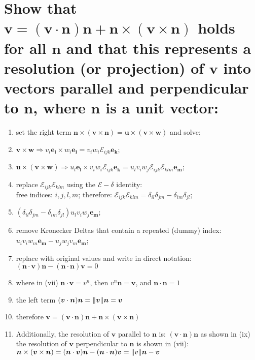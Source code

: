 \documentclass[10pt, letterpaper]{article}
\begin{document}
\section{Show that $\bm{v} = (\bm{v} \cdot \bm{n}) \bm{n} + \bm{n} \times (\bm{v} \times \bm{n})$ holds for all $\bm{n}$ and that 		this represents a resolution (or projection) of $\bm{v}$ into vectors parallel and perpendicular to $\bm{n}$, where
		 $\bm{n}$ is a unit vector:}
		 
	\begin{enumerate}[label = (\roman*)]
		\item set the right term  $\bm{n} \times (\bm{v} \times \bm{n}) = \bm{u} \times (\bm{v} \times \bm{w}) $ and solve;
		\item	$\bm{v} \times \bm{w} \Rightarrow v_i \bm{e_i} \times w_i \bm{e_i} = v_i w_i \mathcal{E}_{ijk} \bm{e_k} $;
		\item$ \bm{u} \times (\bm{v} \times \bm{w}) \Rightarrow u_l \bm{e_l} \times v_i w_i \mathcal{E}_{ijk} \bm{e_k}
			= u_l v_i w_j  \mathcal{E}_{ijk} \mathcal{E}_{klm} \bm{e_m} $;
		\item replace $\mathcal{E}_{ijk} \mathcal{E}_{klm} $ using the $\mathcal{E} - \delta$ identity:\\
			free indices: $\mathit{i, j, l, m}$; therefore:  $\mathcal{E}_{ijk} \mathcal{E}_{klm} = 
			\delta_{il} \delta_{jm} - \delta_{im} \delta_{jl}$;
		\item $(\delta_{il} \delta_{jm} - \delta_{im} \delta_{jl}) u_l v_i w_j \bm{e_m}$;
		\item remove Kronecker Deltas that contain a repeated (dummy) index:  $u_i v_i w_m \bm{e_m} - u_j w_j v_m 
			\bm{e_m}$;
		\item replace with original values and write in direct notation: $(\bm{n} \cdot \bm{v}) \bm{n} - 
			(\bm{n} \cdot \bm{n}) \bm{v} = 0$
		\item where in (vii) $\bm{n} \cdot \bm{v} = v^n$, then $v^n \bm{n} = \bm{v}$, and $\bm{n} \cdot \bm{n} = 1$
		\item the left term $(\bm{v} \cdot \bm{n}) \bm{n}= \Arrowvert \bm{v} \Arrowvert \bm{n} = \bm{v}$
		\item therefore $\bm{v} = (\bm{v} \cdot \bm{n}) \bm{n} + \bm{n} \times (\bm{v} \times \bm{n})$
		\item Additionally, the resolution of $\bm{v}$ parallel to $\bm{n}$ is: $(\bm{v} \cdot \bm{n}) \bm{n}$ as shown in (ix)\\
			the resolution of $\bm{v}$ perpendicular to $\bm{n}$ is shown in (vii): $\bm{n} \times (\bm{v} \times \bm{n})
			 =(\bm{n} \cdot \bm{v}) \bm{n} - 
			(\bm{n} \cdot \bm{n}) \bm{v} = \Arrowvert v \Arrowvert \bm{n} - \bm{v}$
					
	\end{enumerate}
			
\end{document}
